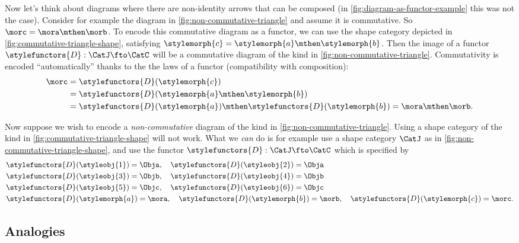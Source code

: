 \begin{marginfigure}
    \centering
    \caption{}
    \label{fig:commutative-triangle-shape}
\end{marginfigure}


Now let's think about diagrams where there are non-identity arrows that can be composed (in \cref{fig:diagram-as-functor-example} this was not the case). 
Consider for example the diagram in \cref{fig:non-commutative-triangle} and assume it is commutative. So $\morc = \mora \mthen \morb$. To encode this commutative diagram as a functor, we can use the shape category depicted in \cref{fig:commutative-triangle-shape}, satisfying $\stylemorph{c} = \stylemorph{a} \mthen \stylemorph{b}$. Then the image of a functor $\stylefunctors{D}: \CatJ \fto \CatC$ will be a commutative diagram of the kind in \cref{fig:non-commutative-triangle}. Commutativity is encoded ``automatically'' thanks to the the laws of a functor (compatibility with composition): 
\begin{align*}
\morc &= \stylefunctors{D}(\stylemorph{c}) \\
	&= \stylefunctors{D}(\stylemorph{a} \mthen \stylemorph{b}) \\
	&= \stylefunctors{D}(\stylemorph{a}) \mthen \stylefunctors{D}(\stylemorph{b}) = \mora \mthen \morb.
\end{align*}

\begin{marginfigure}
    \centering
    \caption{}
    \label{fig:non-commutative-triangle-shape}
\end{marginfigure}

Now suppose we wish to encode a \emph{non-commutative} diagram of the kind in \cref{fig:non-commutative-triangle}. Using a shape category of the kind in \cref{fig:commutative-triangle-shape} will not work. What we \emph{can} do is for example use a shape category $\CatJ$ as in \cref{fig:non-commutative-triangle-shape}, and use the functor $\stylefunctors{D}: \CatJ \fto \CatC$ which is specified by
\begin{align*}
& \stylefunctors{D}(\styleobj{1}) = \Obja, \quad \stylefunctors{D}(\styleobj{2}) = \Obja  \\
& \stylefunctors{D}(\styleobj{3}) = \Objb, \quad \stylefunctors{D}(\styleobj{4}) = \Objb  \\
& \stylefunctors{D}(\styleobj{5}) = \Objc, \quad \stylefunctors{D}(\styleobj{6}) = \Objc  \\
& \stylefunctors{D}(\stylemorph{a}) = \mora, \quad \stylefunctors{D}(\stylemorph{b}) = \morb, \quad \stylefunctors{D}(\stylemorph{c}) = \morc.
\end{align*}


\subsection{Analogies}



